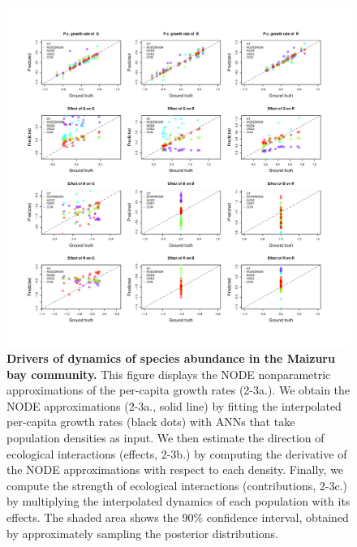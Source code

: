 \documentclass[11pt, oneside]{article}
\begin{document}
\begin{figure}[H]
\includegraphics[width=1\linewidth,page=27]{figures/figures_supplementary.pdf}
\caption{
    \textbf{Drivers of dynamics of species abundance in the Maizuru bay community.}
    This figure displays the NODE nonparametric approximations of the per-capita growth rates (2-3a.). 
    We obtain the NODE approximations (2-3a., solid line) by fitting the interpolated per-capita growth rates (black dots) with ANNs that take population densities as input. 
    We then estimate the direction of ecological interactions (effects, 2-3b.) by computing the derivative of the NODE approximations with respect to each density. 
    Finally, we compute the strength of ecological interactions (contributions, 2-3c.) by multiplying the interpolated dynamics of each population with its effects. 
    The shaded area shows the 90\% confidence interval, obtained by approximately sampling the posterior distributions.
}
\end{figure}
\newpage
\end{document}
